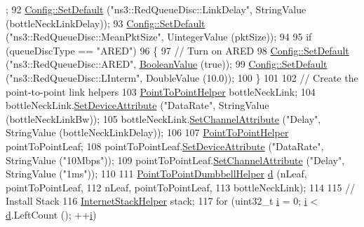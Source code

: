 \begin{DoxyCode}
      ;
92   \hyperlink{group__config_ga2e7882df849d8ba4aaad31c934c40c06}{Config::SetDefault} (\textcolor{stringliteral}{"ns3::RedQueueDisc::LinkDelay"}, StringValue (bottleNeckLinkDelay));
93   \hyperlink{group__config_ga2e7882df849d8ba4aaad31c934c40c06}{Config::SetDefault} (\textcolor{stringliteral}{"ns3::RedQueueDisc::MeanPktSize"}, UintegerValue (pktSize));
94 
95   \textcolor{keywordflow}{if} (queueDiscType == \textcolor{stringliteral}{"ARED"})
96     \{
97       \textcolor{comment}{// Turn on ARED}
98       \hyperlink{group__config_ga2e7882df849d8ba4aaad31c934c40c06}{Config::SetDefault} (\textcolor{stringliteral}{"ns3::RedQueueDisc::ARED"}, 
      \hyperlink{classns3_1_1BooleanValue}{BooleanValue} (\textcolor{keyword}{true}));
99       \hyperlink{group__config_ga2e7882df849d8ba4aaad31c934c40c06}{Config::SetDefault} (\textcolor{stringliteral}{"ns3::RedQueueDisc::LInterm"}, DoubleValue (10.0));
100     \}
101 
102   \textcolor{comment}{// Create the point-to-point link helpers}
103   \hyperlink{classns3_1_1PointToPointHelper}{PointToPointHelper} bottleNeckLink;
104   bottleNeckLink.\hyperlink{classns3_1_1PointToPointHelper_a4577f5ab8c387e5528af2e0fbab1152e}{SetDeviceAttribute}  (\textcolor{stringliteral}{"DataRate"}, StringValue (bottleNeckLinkBw));
105   bottleNeckLink.\hyperlink{classns3_1_1PointToPointHelper_a6b5317fd17fb61e5a53f8d66a90b63b9}{SetChannelAttribute} (\textcolor{stringliteral}{"Delay"}, StringValue (bottleNeckLinkDelay));
106 
107   \hyperlink{classns3_1_1PointToPointHelper}{PointToPointHelper} pointToPointLeaf;
108   pointToPointLeaf.\hyperlink{classns3_1_1PointToPointHelper_a4577f5ab8c387e5528af2e0fbab1152e}{SetDeviceAttribute}    (\textcolor{stringliteral}{"DataRate"}, StringValue (\textcolor{stringliteral}{"10Mbps"}));
109   pointToPointLeaf.\hyperlink{classns3_1_1PointToPointHelper_a6b5317fd17fb61e5a53f8d66a90b63b9}{SetChannelAttribute}   (\textcolor{stringliteral}{"Delay"}, StringValue (\textcolor{stringliteral}{"1ms"}));
110 
111   \hyperlink{classns3_1_1PointToPointDumbbellHelper}{PointToPointDumbbellHelper} \hyperlink{buildings__pathloss_8m_a9f9b934daed17a4d3613b6886ff4cf4b}{d} (nLeaf, pointToPointLeaf,
112                                 nLeaf, pointToPointLeaf,
113                                 bottleNeckLink);
114 
115   \textcolor{comment}{// Install Stack}
116   \hyperlink{classns3_1_1InternetStackHelper}{InternetStackHelper} stack;
117   \textcolor{keywordflow}{for} (uint32\_t \hyperlink{bernuolliDistribution_8m_a6f6ccfcf58b31cb6412107d9d5281426}{i} = 0; \hyperlink{bernuolliDistribution_8m_a6f6ccfcf58b31cb6412107d9d5281426}{i} < \hyperlink{buildings__pathloss_8m_a9f9b934daed17a4d3613b6886ff4cf4b}{d}.LeftCount (); ++\hyperlink{bernuolliDistribution_8m_a6f6ccfcf58b31cb6412107d9d5281426}{i})

\end{DoxyCode}
